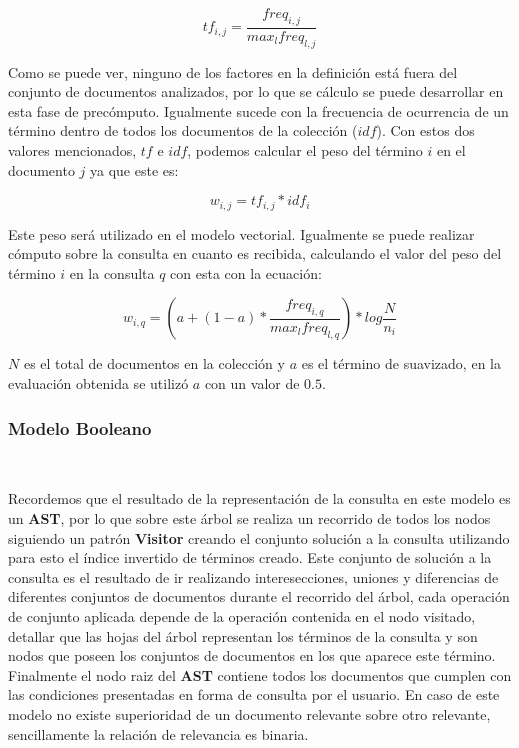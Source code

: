 \documentclass{llncs}
\begin{document}
\begin{equation}
    tf_{i, j} = \frac{freq_{i, j}}{max_l freq_{l, j}}
\end{equation}

Como se puede ver, ninguno de los factores en la definición está fuera del conjunto de documentos analizados, por lo que se cálculo se puede desarrollar en esta fase de precómputo. Igualmente sucede con la frecuencia de ocurrencia de un término dentro de todos los documentos de la colección ({\bfseries $idf$}). Con estos dos valores mencionados, $tf$ e $idf$, podemos calcular el peso del término $i$ en el documento $j$ ya que este es:

\begin{equation}
    w_{i, j} = tf_{i, j} * idf_{i}
\end{equation}

Este peso será utilizado en el modelo vectorial. Igualmente se puede realizar cómputo sobre la consulta en cuanto es recibida, calculando el valor del peso del término $i$ en la consulta $q$ con esta con la ecuación:

\begin{equation}
    w_{i, q} = (a + (1 - a) * \frac{freq_{i, q}}{max_l freq_{l, q}}) * log \frac{N}{n_i}
\end{equation}

$N$ es el total de documentos en la colección y $a$ es el término de suavizado, en la evaluación obtenida se utilizó $a$ con un valor de $0.5$.

\subsubsection{Modelo Booleano}\

Recordemos que el resultado de la representación de la consulta en este modelo es un {\bfseries AST}, por lo que sobre este árbol se realiza un recorrido de todos los nodos siguiendo un patrón {\bfseries Visitor} creando el conjunto solución a la consulta utilizando para esto el índice invertido de términos creado. Este conjunto de solución a la consulta es el resultado de ir realizando interesecciones, uniones y diferencias de diferentes conjuntos de documentos durante el recorrido del árbol, cada operación de conjunto aplicada depende de la operación contenida en el nodo visitado, detallar que las hojas del árbol representan los términos de la consulta y son nodos que poseen los conjuntos de documentos en los que aparece este término. Finalmente el nodo raiz del {\bfseries AST} contiene todos los documentos que cumplen con las condiciones presentadas en forma de consulta por el usuario. En caso de este modelo no existe superioridad de un documento relevante sobre otro relevante, sencillamente la relación de relevancia es binaria.
\end{document}
